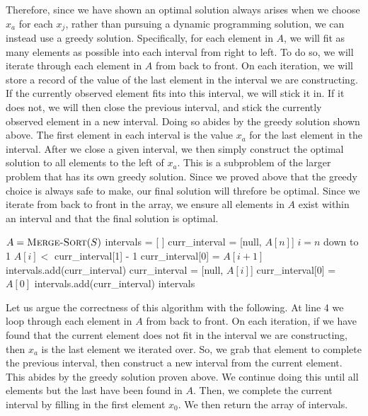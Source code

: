\documentclass[11pt]{article}
\begin{document}
Therefore, since we have shown an optimal solution always arises when we choose $x_a$ for each $x_j$, rather than pursuing a dynamic programming solution, we can instead use a greedy solution. Specifically, for each element in $A$, we will fit as many elements as possible into each interval from right to left. To do so, we will iterate through each element in $A$ from back to front. On each iteration, we will store a record of the value of the last element in the interval we are constructing. If the currently observed element fits into this interval, we will stick it in. If it does not, we will then close the previous interval, and stick the currently observed element in a new interval. Doing so abides by the greedy solution shown above. The first element in each interval is the value $x_a$ for the last element in the interval. After we close a given interval, we then simply construct the optimal solution to all elements to the left of $x_a$. This is a subproblem of the larger problem that has its own greedy solution. Since we proved above that the greedy choice is always safe to make, our final solution will threfore be optimal. Since we iterate from back to front in the array, we ensure all elements in $A$ exist within an interval and that the final solution is optimal.

\begin{codebox}
\li $A = \textnormal{\scshape Merge-Sort}(S)$
\li intervals = [ ]
\li curr\_interval = [null, $A[n]$]
\li \For $i=n$ down to 1 \Do
\li     \If $A[i] <$ curr\_interval[1] - 1 \Then
\li         curr\_interval[0] = $A[i+1]$
\li         intervals.add(curr\_interval)
\li         curr\_interval = [null, $A[i]$]
        \End
    \End
\li curr\_interval[0] = $A[0]$
\li intervals.add(curr\_interval)
\li \Return intervals
\end{codebox}

Let us argue the correctness of this algorithm with the following. At line 4 we loop through each element in $A$ from back to front. On each iteration, if we have found that the current element does not fit in the interval we are constructing, then $x_a$ is the last element we iterated over. So, we grab that element to complete the previous interval, then construct a new interval from the current element. This abides by the greedy solution proven above. We continue doing this until all elements but the last have been found in $A$. Then, we complete the current interval by filling in the first element $x_0$. We then return the array of intervals.
\end{document}
